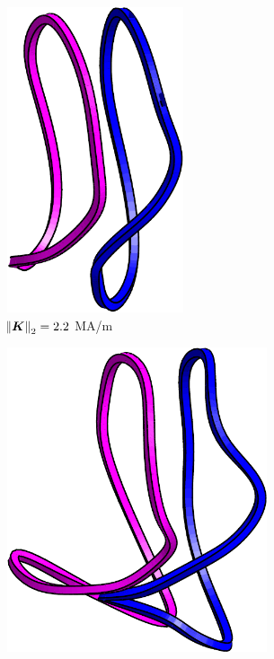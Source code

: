 \documentclass[aps,unsortedaddress]{revtex4-1}
\begin{document}
\begin{figure}
\begin{subfigure}[b]{0.3\textwidth}
\includegraphics[width=0.57\textwidth]{target_2_2e6.pdf}
\caption{$\norm{\bm{K}}_2 = 2.2$ MA/m}
\end{subfigure}
\begin{subfigure}[b]{0.3\textwidth}
\includegraphics[width=0.84\textwidth]{target_2_7e6.pdf}

\end{subfigure}
\end{figure}
\end{document}
